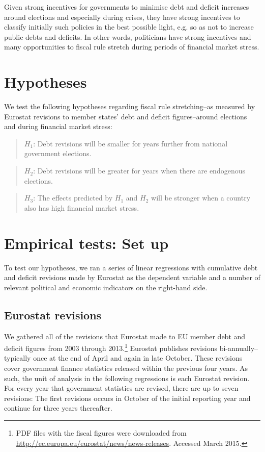 \documentclass[]{article}
\begin{document}
Given strong incentives for governments to minimise debt and deficit increases around elections and especially during crises, they have strong incentives to  classify initially such policies in the best possible light, e.g. so as not to increase public debts and deficits. In other words, politicians have strong incentives and many opportunities to fiscal rule stretch during periods of financial market stress.

\section{Hypotheses}

We test the following hypotheses regarding fiscal rule stretching--as measured by Eurostat revisions to member states' debt and deficit figures--around elections and during financial market stress:

\begin{quote}
    $H_{1}$: Debt revisions will be smaller for years further from national government elections.
\end{quote}

\begin{quote}
    $H_{2}$: Debt revisions will be greater for years when there are endogenous elections.
\end{quote}

\begin{quote}
    $H_{3}$: The effects predicted by $H_{1}$ and $H_{2}$ will be stronger when a country also has high financial market stress.
\end{quote}

\section{Empirical tests: Set up}

To test our hypotheses, we ran a series of linear regressions with cumulative debt and deficit revisions made by Eurostat as the dependent variable and a number of relevant political and economic indicators on the right-hand side.

\subsection{Eurostat revisions}

We gathered all of the revisions that Eurostat made to EU member debt and deficit figures from 2003 through 2013.\footnote{PDF files with the fiscal figures were downloaded from \url{http://ec.europa.eu/eurostat/news/news-releases}. Accessed March 2015.} Eurostat publishes revisions bi-annually--typically once at the end of April and again in late October. These revisions cover government finance statistics released within the previous four years. As such, the unit of analysis in the following regressions is each Eurostat revision. For every year that government statistics are revised, there are up to seven revisions: The first revisions occurs in October of the initial reporting year and continue for three years thereafter.
\end{document}
